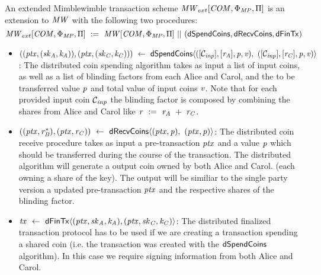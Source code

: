 \begin{definition}
    \label{def:ext-mw-tx-scheme}
    An extended Mimblewimble transaction scheme $\mathit{MW}_{ext}[\mathit{COM},\Phi_{\mathit{MP}},\Pi]$ is an extension to $\mathit{MW}$ with the following two procedures:
    \[ \mathit{MW}_{ext}[\mathit{COM},\Phi_{\mathit{MP}},\Pi] ~:=~ \mathit{MW}[\mathit{COM},\Phi_{\mathit{MP}},\Pi] ~||~ (\mathsf{dSpendCoins}, \mathsf{dRecvCoins}, \mathsf{dFinTx}) \]
    \begin{itemize}
        \item $((\mathit{ptx},(\mathit{sk}_{\mathit{A}},\mathit{\mathit{k}_{\mathit{A}}})), (\mathit{ptx},(\mathit{sk}_{\mathit{C}},\mathit{\mathit{k}_{\mathit{C}}}))) \\
        ~\leftarrow~ \mathsf{dSpendCoins} \langle ([\mathcal{C}_{\mathit{inp}}],[\mathit{r}_{\mathit{A}}],\mathit{p},\mathit{v}) ,~ ([\mathcal{C}_{\mathit{inp}}],[\mathit{r}_{\mathit{C}}],\mathit{p},\mathit{v}) \rangle$:
        The distributed coin spending algorithm takes as input a list of input coins, as well as a list of blinding factors from each Alice and Carol, and the to be transferred value $\mathit{p}$ and
        total value of input coins $\mathit{v}$. Note that for each provided input coin $\mathcal{C}_{\mathit{inp}}$ the blinding factor is composed by combining the shares from Alice and Carol like
        $\mathit{r} ~:=~ \mathit{r}_{\mathit{A}} ~+~ \mathit{r}_{\mathit{C}}$.
        \item $((\mathit{ptx}, \mathit{r}_{\mathit{B}}^*), (\mathit{ptx}, \mathit{r}_{\mathit{C}})) ~\leftarrow~ \mathsf{dRecvCoins} \langle(\mathit{ptx},\mathit{p}) ,~ (\mathit{ptx},\mathit{p}) \rangle$: The distributed coin receive procedure takes as input a pre-transaction $\mathit{ptx}$ and
        a value $\mathit{p}$ which should be transferred during the course of the transaction. The distributed algorithm will generate a output coin owned by both Alice and Carol. (each owning a share of the key). The output will be similiar
        to the single party version a updated pre-transaction $\mathit{ptx}$ and the respective shares of the blinding factor.
        \item $\mathit{tx} ~\leftarrow~ \mathsf{dFinTx} \langle(\mathit{ptx},\mathit{sk}_{\mathit{A}},\mathit{\mathit{k}_{\mathit{A}}}),(\mathit{ptx},\mathit{sk}_{\mathit{C}},\mathit{\mathit{k}_{\mathit{C}}})\rangle$: The distributed finalized transaction
        protocol has to be used if we are creating a transaction spending a shared coin (i.e. the transaction was created with the $\mathsf{dSpendCoins}$ algorithm). In this
        case we require signing information from both Alice and Carol.
    \end{itemize}
\end{definition}

